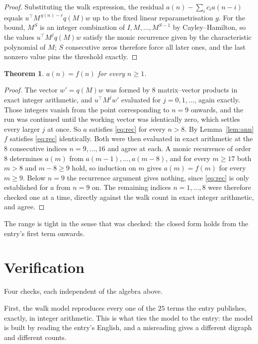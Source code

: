 \documentclass[11pt,a4paper]{article}
\theoremstyle{plain}
\newtheorem{theorem}{Theorem}
\theoremstyle{definition}
\begin{document}
\begin{proof}
Substituting the walk expression, the residual $a(n)-\sum_ic_ia(n-i)$ equals
$u^{\!\top}M^{\,g(n)-r}q(M)w$ up to the fixed linear reparametrisation $g$. For the bound,
$M^{S}$ is an integer combination of $I,M,\dots,M^{S-1}$ by Cayley--Hamilton, so the values
$u^{\!\top}M^{j}q(M)w$ satisfy the monic recurrence given by the characteristic polynomial of
$M$; $S$ consecutive zeros therefore force all later ones, and the last nonzero value pins the
threshold exactly.
\end{proof}

\begin{theorem}
$a(n)=f(n)$ for every $n\ge1$.
\end{theorem}

\begin{proof}
The vector $w'=q(M)w$ was formed by $8$ matrix--vector products in exact integer
arithmetic, and $u^{\!\top}M^{j}w'$ evaluated for $j=0,1,\dots$, again exactly. Those integers
vanish from the point corresponding to $n=9$ onwards, and the run was continued until the
working vector was identically zero, which settles every larger $j$ at once. So $a$ satisfies
\eqref{eq:rec} for every $n>8$. By Lemma~\ref{lem:ann} $f$ satisfies \eqref{eq:rec}
identically. Both were then evaluated in exact arithmetic at the $8$ consecutive indices
$n=9,\dots,16$ and agree at each. A monic recurrence of order $8$
determines $a(m)$ from $a(m-1),\dots,a(m-8)$, and for every $m\ge17$ both
$m>8$ and $m-8\ge9$ hold, so induction on $m$ gives $a(m)=f(m)$ for every
$m\ge9$.
Below $n=9$ the recurrence argument gives nothing, since \eqref{eq:rec} is only
established for $a$ from $n=9$ on. The remaining indices $n=1,\dots,8$ were
therefore checked one at a time, directly against the walk count in exact integer arithmetic,
and agree.
\end{proof}

The range is tight in the sense that was checked: the closed form holds from the entry's first term onwards.

\section{Verification}

Four checks, each independent of the algebra above.

First, the walk model reproduces every one of the $25$ terms the entry publishes,
exactly, in integer arithmetic. This is what ties the model to the entry: the model is built
by reading the entry's English, and a misreading gives a different digraph and different
counts.
\end{document}
